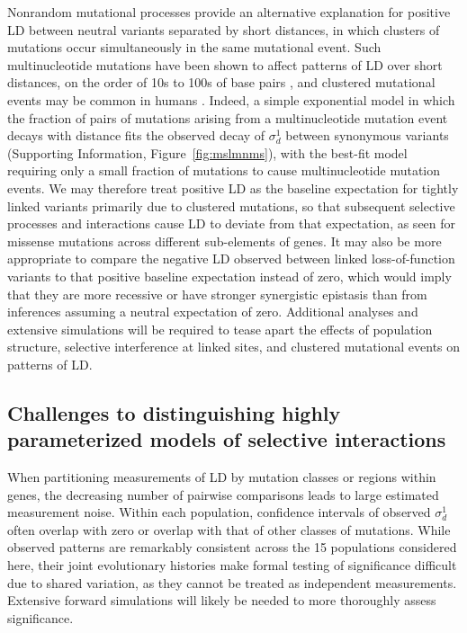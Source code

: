 \documentclass[]{article}
\begin{document}
Nonrandom mutational processes provide an alternative explanation for positive
LD between neutral variants separated by short distances, in which clusters of
mutations occur simultaneously in the same mutational event. Such
multinucleotide mutations have been shown to affect patterns of LD over short
distances, on the order of 10s to 100s of base pairs \citep{Harris2014-zg}, and
clustered mutational events may be common in humans \citep{Besenbacher2016-ac}.
Indeed, a simple exponential model in which the fraction of pairs of mutations
arising from a multinucleotide mutation event decays with distance fits the
observed decay of \(\sigma_d^1\) between synonymous variants (Supporting
Information, Figure~\ref{fig:mslmnms}), with the best-fit model requiring only
a small fraction of mutations to cause multinucleotide mutation events. We may
therefore treat positive LD as the baseline expectation for tightly linked
variants primarily due to clustered mutations, so that subsequent selective
processes and interactions cause LD to deviate from that expectation, as seen
for missense mutations across different sub-elements of genes. It may also be
more appropriate to compare the negative LD observed between linked
loss-of-function variants to that positive baseline expectation instead of
zero, which would imply that they are more recessive or have stronger
synergistic epistasis than from inferences assuming a neutral expectation of
zero. Additional analyses and extensive simulations will be required to tease
apart the effects of population structure, selective interference at linked
sites, and clustered mutational events on patterns of LD.

\subsection{Challenges to distinguishing highly parameterized models of selective interactions}

When partitioning measurements of LD by mutation classes or regions within
genes, the decreasing number of pairwise comparisons leads to large estimated
measurement noise. Within each population, confidence intervals of observed
\(\sigma_d^1\) often overlap with zero or overlap with that of other classes of
mutations. While observed patterns are remarkably consistent across the 15
populations considered here, their joint evolutionary histories make formal
testing of significance difficult due to shared variation, as they cannot be
treated as independent measurements. Extensive forward simulations will likely
be needed to more thoroughly assess significance.
\end{document}
